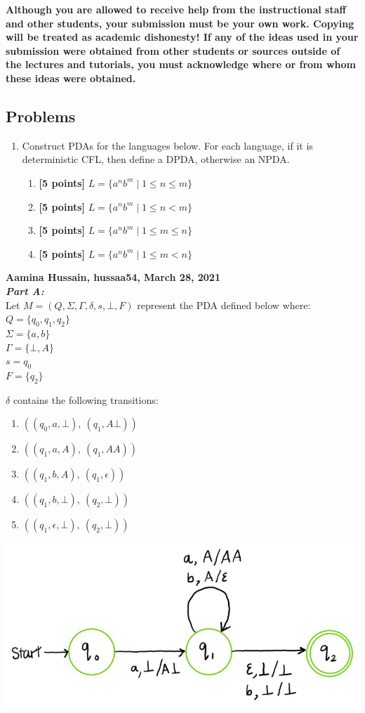 \documentclass[11pt,fleqn]{article}
\newcommand{\be}{\begin{enumerate}}
\newcommand{\ee}{\end{enumerate}}
\newcommand{\set}[1]{{\{ #1 \}}}
\begin{document}
	\textbf{Although you are allowed to receive help from the
		instructional staff and other students, your submission must be your
		own work.  Copying will be treated as academic dishonesty! If any of
		the ideas used in your submission were obtained from other students
		or sources outside of the lectures and tutorials, you must
		acknowledge where or from whom these ideas were obtained.}
	
	\newpage
	
	\subsection*{Problems}
	
	\be
	
	\item  Construct PDAs for the languages below. For each language, if it is deterministic CFL, then define a DPDA, otherwise an NPDA.
	\be
	\item\textbf{[5 points]} $L = \{a^nb^m \mid 1 \le n \le m \}
$
	\item\textbf{[5 points]} $L = \{a^nb^m \mid 1 \le n < m \}$
	\item\textbf{[5 points]} $L = \{a^nb^m \mid 1 \le m \le n \}$
	\item\textbf{[5 points]} $L = \{a^nb^m \mid 1 \le m < n \}$ 
	\ee

	\ee
	\textbf{Aamina Hussain, hussaa54, March 28, 2021}\\
	
	\noindent\textbf{\emph{Part A:}}\\
	Let $M = (Q, \Sigma, \Gamma, \delta, s, \bot, F)$ represent the PDA defined below where:\\
	$Q = \set{q_0, q_1, q_2}$\\
	$\Sigma = \set{a, b}$\\
	$\Gamma = \set{\bot, A}$\\
	$s = q_0$\\
	$F = \set{q_2}$

	\noindent$\delta$ contains the following transitions:
	\be
	\item $((q_0, a, \bot),\ (q_1, A\bot))$
	\item $((q_1, a, A),\ (q_1, AA))$
	\item $((q_1, b, A),\ (q_1, \epsilon))$
	\item $((q_1, b, \bot),\ (q_2, \bot))$
	\item $((q_1, \epsilon, \bot),\ (q_2, \bot))$
	\ee

	\begin{center}
	\includegraphics[scale = 0.5]{partA.JPG}
	\end{center}
	
\end{document}
